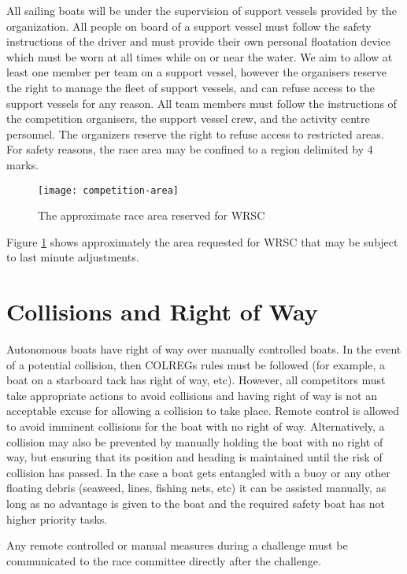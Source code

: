 \documentclass[12pt]{article}
\begin{document}
All sailing boats will be under the supervision of support vessels provided by the
organization.
All people on board of a support vessel must follow the safety instructions of the driver 
and must provide their own personal floatation device which must be worn at all times 
while on or near the water. We aim to allow at least one member per team on a support vessel, 
however the organisers reserve the
right to manage the fleet of support vessels, and can refuse access to the support
vessels for any reason.
All team members must follow the instructions of the competition
organisers, the support vessel crew, and the activity centre personnel. The organizers
reserve the right to refuse access to restricted areas.
For safety reasons, the race area may be confined to a region delimited by 4
marks. 


  \begin{figure}[H]
    \centering
    \texttt{[image: competition-area]}
    \caption{The approximate race area reserved for WRSC}
    \label{fig:competitionarea}
  \end{figure}

  Figure \ref{fig:competitionarea} shows approximately the area requested for WRSC that may be subject to last
minute adjustments.


\section{Collisions and Right of Way}
Autonomous boats have right of way over manually controlled boats. In the event
of a potential
collision, then COLREGs rules must be followed (for example, a boat on a
starboard tack has
right of way, etc). However, all competitors must take appropriate actions to
avoid collisions
and having right of way is not an acceptable excuse for allowing a collision to
take place.
Remote control is allowed to avoid imminent collisions for the boat with no 
right of way. Alternatively, a collision may also be
prevented by manually holding the boat with no right of way, but ensuring that 
its position and heading is maintained until the risk of collision has passed. 
In the case a boat gets entangled with a buoy or any other
floating debris (seaweed, lines, fishing nets, etc) it can be assisted manually,
as long as no advantage is given to the boat and the required safety boat has
not higher priority tasks.

Any remote controlled or manual measures during a challenge must be
communicated to the race committee directly after the challenge.
\end{document}
